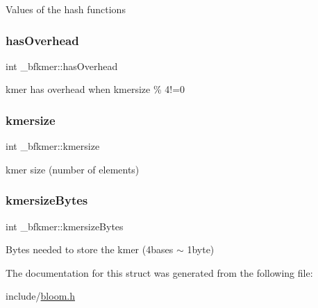 Values of the hash functions \mbox{\label{struct__bfkmer_a78787413a5bdf782f32ff66a8f21be20}} 
\subsubsection{\texorpdfstring{has\+Overhead}{hasOverhead}}
{\footnotesize\ttfamily int \+\_\+bfkmer\+::has\+Overhead}

kmer has overhead when kmersize \% 4!=0 \mbox{\label{struct__bfkmer_aec3b3cd33fdfbd71f38b7c9a21a00574}} 
\subsubsection{\texorpdfstring{kmersize}{kmersize}}
{\footnotesize\ttfamily int \+\_\+bfkmer\+::kmersize}

kmer size (number of elements) \mbox{\label{struct__bfkmer_aad605c14068200c97520fcd6e49f3e7c}} 
\subsubsection{\texorpdfstring{kmersize\+Bytes}{kmersizeBytes}}
{\footnotesize\ttfamily int \+\_\+bfkmer\+::kmersize\+Bytes}

Bytes needed to store the kmer (4bases $\sim$ 1byte) 

The documentation for this struct was generated from the following file\+:\begin{DoxyCompactItemize}
\item 
include/\mbox{\hyperlink{bloom_8h}{bloom.\+h}}\end{DoxyCompactItemize}
